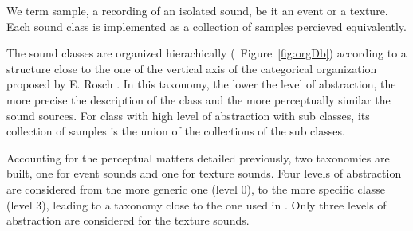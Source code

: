 \documentclass[twoside,twocolumn]{article}
\begin{document}

We term sample, a recording of an isolated sound, be it an event or a texture. Each sound class is implemented as a collection of samples percieved equivalently.


The sound classes are organized hierachically (\cf~Figure~\ref{fig:orgDb}) according to a structure close to the one of the vertical axis of the categorical organization proposed by E. Rosch \cite{rosch1978cognition}. In this taxonomy, the lower the level of abstraction, the more precise the description of the class and the more perceptually similar the sound sources. For class with high level of abstraction with sub classes, its collection of samples is the union of the collections of the sub classes.


Accounting for the perceptual matters detailed previously, two taxonomies are built, one for event sounds and one for texture sounds. Four levels of abstraction are considered from the more generic one (level 0), to the more specific classe (level 3), leading to a taxonomy close to the one used in \cite{Salamon14}. Only three levels of abstraction are considered for the texture sounds.
\end{document}
